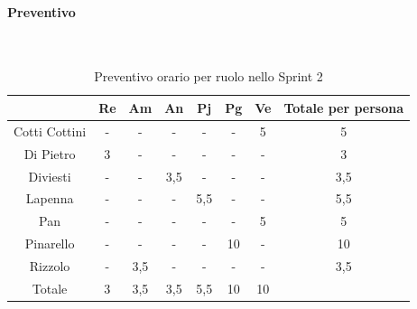 \documentclass{article}
\begin{document}
                \paragraph{Preventivo}\mbox{}\\
                \begin{table}[H]
                    \centering
                    \begin{tabular}{|c|c|c|c|c|c|c|c|}
                    \hline
                                  & Re  & Am  & An  & Pj  & Pg  & Ve  & Totale per persona \\ \hline
                    Cotti Cottini & -   & -   & -   & -   & -   & 5   & 5                  \\ \hline
                    Di Pietro     & 3   & -   & -   & -   & -   & -   & 3                  \\ \hline
                    Diviesti      & -   & -   & 3,5 & -   & -   & -   & 3,5                \\ \hline
                    Lapenna       & -   & -   & -   & 5,5 & -   & -   & 5,5                \\ \hline
                    Pan           & -   & -   & -   & -   & -   & 5   & 5                  \\ \hline
                    Pinarello     & -   & -   & -   & -   & 10  & -   & 10                 \\ \hline
                    Rizzolo       & -   & 3,5 & -   & -   & -   & -   & 3,5                \\ \hline
                    Totale        & 3   & 3,5 & 3,5 & 5,5 & 10  & 10  &                    \\ \hline
                    \end{tabular}
                    \caption{Preventivo orario per ruolo nello Sprint 2}
                \end{table}

\end{document}
